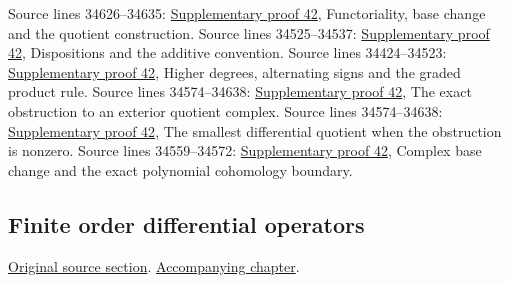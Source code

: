 \begin{AlgebraSourceRoutes}
 Source lines 34626--34635: \hyperlink{algebra_de_rham_notes_20260928}{Supplementary proof 42}, Functoriality, base change and the quotient construction.
 Source lines 34525--34537: \hyperlink{algebra_de_rham_notes_20260928}{Supplementary proof 42}, Dispositions and the additive convention.
 Source lines 34424--34523: \hyperlink{algebra_de_rham_notes_20260928}{Supplementary proof 42}, Higher degrees, alternating signs and the graded product rule.
 Source lines 34574--34638: \hyperlink{algebra_de_rham_notes_20260928}{Supplementary proof 42}, The exact obstruction to an exterior quotient complex.
 Source lines 34574--34638: \hyperlink{algebra_de_rham_notes_20260928}{Supplementary proof 42}, The smallest differential quotient when the obstruction is nonzero.
 Source lines 34559--34572: \hyperlink{algebra_de_rham_notes_20260928}{Supplementary proof 42}, Complex base change and the exact polynomial cohomology boundary.
\end{AlgebraSourceRoutes}

\subsection{Finite order differential operators}
\hypertarget{algebra-source-section-differential-operators}{}
\noindent\href{https://github.com/stacks/stacks-project/blob/a04446e57ec1fbc252a871afcec7752fb2807b14/algebra.tex\#L34651}{Original source section}. \href{algebra.pdf\#nameddest=section-differential-operators}{Accompanying chapter}.

